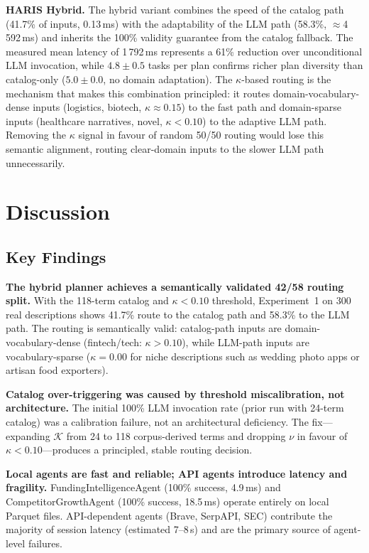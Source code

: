 \documentclass[preprint,12pt]{elsarticle}
\newcommand{\calK}{\mathcal{K}}
\begin{document}
\textbf{HARIS Hybrid.} The hybrid variant combines the speed of the catalog
path (41.7\% of inputs, 0.13\,ms) with the adaptability of the LLM path
(58.3\%, ${\approx}$4\,592\,ms) and inherits the 100\% validity guarantee
from the catalog fallback. The measured mean latency of 1\,792\,ms represents
a 61\% reduction over unconditional LLM invocation, while $4.8 \pm 0.5$ tasks per
plan confirms richer plan diversity than catalog-only ($5.0 \pm 0.0$, no
domain adaptation). The $\kappa$-based routing is the mechanism that makes this
combination principled: it routes domain-vocabulary-dense inputs (logistics,
biotech, $\kappa \approx 0.15$) to the fast path and domain-sparse inputs
(healthcare narratives, novel, $\kappa < 0.10$) to the adaptive LLM path.
Removing the $\kappa$ signal in favour of random 50/50 routing would lose this
semantic alignment, routing clear-domain inputs to the slower LLM path
unnecessarily.

\section{Discussion}
\label{sec:discussion}

\subsection{Key Findings}

\textbf{The hybrid planner achieves a semantically validated 42/58 routing split.}
With the 118-term catalog and $\kappa < 0.10$ threshold, Experiment~1 on 300
real descriptions shows 41.7\% route to the catalog path and 58.3\% to the LLM
path. The routing is semantically valid: catalog-path inputs are
domain-vocabulary-dense (fintech/tech: $\kappa{>}0.10$), while LLM-path inputs
are vocabulary-sparse ($\kappa{=}0.00$ for niche descriptions such as
wedding photo apps or artisan food exporters).

\textbf{Catalog over-triggering was caused by threshold miscalibration, not
architecture.} The initial 100\% LLM invocation rate (prior run with 24-term
catalog) was a calibration failure, not an architectural deficiency. The
fix---expanding $\calK$ from 24 to 118 corpus-derived terms and dropping $\nu$
in favour of $\kappa < 0.10$---produces a principled, stable routing decision.

\textbf{Local agents are fast and reliable; API agents introduce latency and
fragility.} FundingIntelligenceAgent (100\% success, 4.9\,ms) and
CompetitorGrowthAgent (100\% success, 18.5\,ms) operate entirely on local Parquet
files. API-dependent agents (Brave, SerpAPI, SEC) contribute the majority of
session latency (estimated 7--8\,s) and are the primary source of agent-level
failures.
\end{document}
